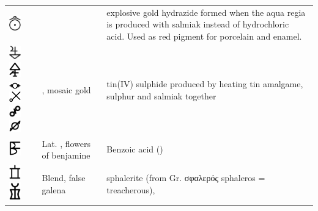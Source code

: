 \documentclass[british,final,landscape]{scrartcl}
\begin{document}
\begin{refsection}
\begin{supertabular}{p{0.3\textwidth}p{0.34\textwidth}p{0.34\textwidth}}
   \includegraphics[width=5mm]{Compounds/AurumFulminans} &  & explosive gold hydrazide  formed when the aqua regia is produced with salmiak instead of hydrochloric acid. Used as red pigment for porcelain and enamel. \\
   \includegraphics[width=5mm]{Compounds/AurumMusivum} \includegraphics[width=5mm]{Compounds/AurumMusivum2} \includegraphics[width=5mm]{Compounds/AurumMusivum3} \includegraphics[width=5mm]{Compounds/AurumMusivum4} \includegraphics[width=5mm]{Compounds/AurumMusivum5} \includegraphics[width=5mm]{Compounds/AurumMusivum6} & , mosaic gold & tin(IV) sulphide  produced by heating tin amalgame, sulphur and salmiak together \\
   \includegraphics[width=5mm]{Compounds/BenjamineFlowers} & Lat. , flowers of benjamine & Benzoic acid () \\
   \includegraphics[width=5mm]{Compounds/Sphalerite} \includegraphics[width=5mm]{Compounds/Sphalerite2} & Blend, false galena & sphalerite (from Gr. \foreignlanguage{greek}{σφαλερός} sphaleros = treacherous),  \\

\end{supertabular}
\end{refsection}
\end{document}
